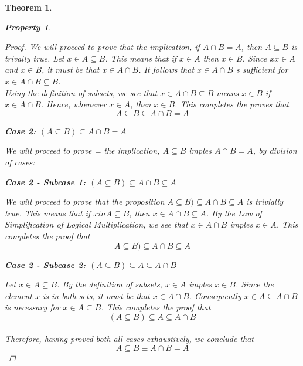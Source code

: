 \documentclass{book}
\newtheorem{theorem}{Theorem}[section]
\newtheorem{property}{Property}[theorem]
\theoremstyle{definition}
\theoremstyle{remark}
\begin{document}
\begin{theorem}
\begin{property}
\begin{proof}
                We will proceed to prove that the implication, if $A \cap B = A$, then $A \subseteq B$ is trivally true. Let $x \in A \subseteq B$. This means that if $x \in A$ then $x \in B$. Since $xx \in A$ and $x \in B$, it must be that $x \in A \cap B$. It follows that $x \in A \cap B$ s sufficient for $x \in A \cap B \subseteq B$. \\
                
                Using the definition of subsets, we see that $x \in A \cap B \subseteq B$ means $x \in B$ if $x \in A \cap B$. Hence, whenever $x \in A$, then $x \in B$. This completes the proves that $$ A \subseteq B \subseteq A \cap B = A $$
            
            \begin{flushleft} \textbf{Case 2: $(A \subseteq B) \subseteq A \cap B = A$} \end{flushleft} 
                We will proceed to prove = the implication, $A \subseteq B$ imples $A \cap B = A$, by division of cases:
            
                    \begin{flushleft} \textbf{Case 2 - Subcase 1: $(A \subseteq B) \subseteq A \cap B \subseteq A$} \end{flushleft}     
                        We will proceed to prove that the proposition $A \subseteq B) \subseteq A \cap B \subseteq A$ is trivially true. This means that if $x in A \subseteq B$, then $x \in A \cap B \subseteq A$. By the Law of Simplification of Logical Multiplication, we see that $x \in A \cap B$ imples $x \in A$. This completes the proof that $$ A \subseteq B) \subseteq A \cap B \subseteq A $$  
       
                    \begin{flushleft} \textbf{Case 2 - Subcase 2: $(A \subseteq B) \subseteq A \subseteq A \cap B $} \end{flushleft}     
                        Let $x \in A \subseteq B$. By the definition of subsets, $x \in A$ imples $x \in B$. Since the element $x$ is in both sets, it must be that $x \in A \cap B$. Consequently $x \in A \subseteq A \cap B$ is necessary for $x \in A \subseteq B$. This completes the proof that $$ (A \subseteq B) \subseteq A \subseteq A \cap B  $$ \\        
            Therefore, having proved both all cases exhaustively, we conclude that $$ A \subseteq B \equiv A \cap B = A $$
        \end{proof}
    \end{property}
\end{theorem}
\end{document}
